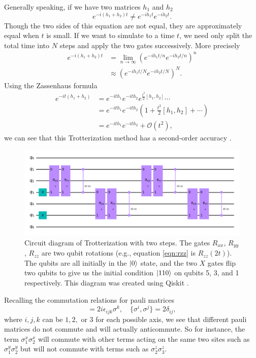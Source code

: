 \documentclass[aps,prl, reprint]{revtex4-2}
\begin{document}
Generally speaking, if we have two matrices $h_1$ and $h_2$
\begin{equation}
e^{-i(h_1 + h_2)t} \neq e^{-i h_1 t}e^{-i h_2 t}.
\end{equation}
Though the two sides of this equation are not equal, they are approximately equal when $t$ is small. If we want to simulate to a time $t$, we need only split the total time into $N$ steps and apply the two gates successively. More precisely
\begin{align}
e^{-i (h_1 + h_2)t}&=\lim _{n \rightarrow \infty}\left(e^{-i h_1 t/ n} e^{-i h_2 t / n}\right)^{n}\\
&\approx \left(e^{-i h_1 t / N} e^{-i h_2 t/ N}\right)^{N}.
\end{align}
Using the Zassenhaus formula 
\begin{align*}
e^{-i t(h_1+h_2)}&=e^{-i t h_1} e^{-i t h_2} e^{\frac{t^{2}}{2}[h_1, h_2]}\cdots\\
&= e^{-i t h_1} e^{-i t h_2}(1 +\frac{t^{2}}{2}[h_1, h_2] + \cdots)\\
&=e^{-i t h_1} e^{-i t h_2} + \mathcal{O}(t^2),
\end{align*}
we can see that this Trotterization method has a second-order accuracy \cite{dupays2021closed}.
\begin{figure}[t]
\includegraphics[width=\textwidth]{../Trotterization.png}
\caption{Circuit diagram of Trotterization with two steps. The gates $R_{xx}$, $R_{yy}$, $R_{zz}$ are two qubit rotations (e.g., equation \ref{eqn:rzz} is $R_{zz}(2t)$). The qubits are all initially in the $\ket{0}$ state, and the two $X$ gates flip two qubits to give us the initial condition $\ket{110}$ on qubits 5, 3, and 1 respectively. This diagram was created using Qiskit \cite{Qiskit}.}
\label{fig:TrotterCircuit}
\end{figure}

Recalling the commutation relations for pauli matrices
\begin{equation}
[\sigma^{i}, \sigma^{j}] = 2i \epsilon_{ijk}\sigma^{k}, \quad \{\sigma^{i}, \sigma^{j}\} = 2\delta_{ij	},
\end{equation}
where $i,j,k$ can be $1,2,$ or 3 for each possible axis, we see that different pauli matrices do not commute and will actually anticommute. So for instance, the term $\sigma_{1}^{x} \sigma_{2}^{x}$ will commute with other terms acting on the same two sites such as $\sigma_{1}^{y} \sigma_{2}^{y}$ but will not commute with terms such as $\sigma_{2}^{z} \sigma_{3}^{z}$.
\end{document}

